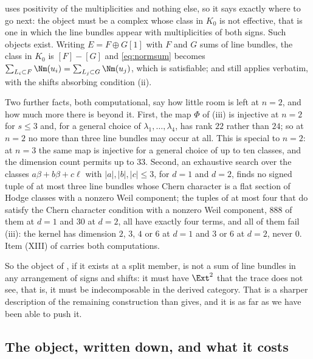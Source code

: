 \begin{remark}
\label{rem:whatitmustbe}
 uses positivity of the multiplicities and nothing else,
so it says exactly where to go next: the object must be a complex whose
class in $K_{0}$ is not effective, that is one in which the line bundles
appear with multiplicities of both signs. Such objects exist. Writing
$E=F\oplus G[1]$ with $F$ and $G$ sums of line bundles, the class in $K_{0}$
is $[F]-[G]$ and \eqref{eq:normsum} becomes
$\sum_{L_{i}\subset F}\Nm(u_{i})=\sum_{L_{j}\subset G}\Nm(u_{j})$, which is
satisfiable; and  still applies verbatim, with the
shifts absorbing condition (ii).

Two further facts, both computational, say how little room is left at $n=2$,
and how much more there is beyond it. First, the map $\Phi$ of
(iii) is injective at $n=2$ for $s\le3$ and, for a
general choice of $\lambda_{1},\dots,\lambda_{4}$, has rank $22$ rather than
$24$; so at $n=2$ no more than three line bundles may occur at all. This is
special to $n=2$: at $n=3$ the same map is injective for a general choice of
up to ten classes, and the dimension count permits up to $33$. Second, an
exhaustive search over the classes $a\beta+b\widehat\beta+c\ell$ with
$|a|,|b|,|c|\le3$, for $d=1$ and $d=2$, finds no signed tuple of at most
three line bundles whose Chern character is a flat section of Hodge classes
with a nonzero Weil component; the tuples of at most four that do satisfy the
Chern character condition with a nonzero Weil component, $888$ of them at
$d=1$ and $30$ at $d=2$, all have exactly four terms, and all of them fail
(iii): the kernel has dimension $2$, $3$, $4$ or $6$
at $d=1$ and $3$ or $6$ at $d=2$, never $0$. Item (XIII) of
 carries both computations.

So the object of , if it exists at a split member, is
not a sum of line bundles in any arrangement of signs and shifts: it must have
$\Ext^{2}$ that the trace does not see, that is, it must be indecomposable in
the derived category. That is a sharper description of the remaining
construction than  gives, and it is as far as we have been
able to push it.
\end{remark}

\subsection{The object, written down, and what it costs}
\label{ssec:pte}

